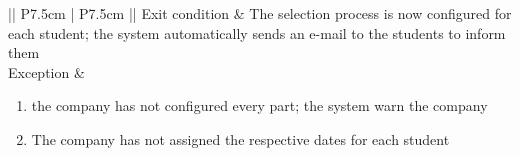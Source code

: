 \begin{table} [H]
\begin{tabular}{|| P{7.5cm} | P{7.5cm} ||}
						Exit condition & The selection process is now configured 
						for each student; the system 
						automatically sends an e-mail to the 
						students to inform them   \\
						\hline
						Exception & \parbox{5cm}{\begin{enumerate}[label=\alpha]
								\item the company has not configured 
								every part; the system warn the 
								company
								\item The company has not assigned 
								the respective dates for each 
								student \\
						\end{enumerate}} \\
						\hline
					\end{tabular}
				\end{table}
				
